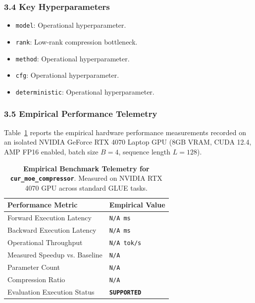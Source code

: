 \subsubsection*{3.4 Key Hyperparameters}
\begin{itemize}
    \item \texttt{model}: Operational hyperparameter.
    \item \texttt{rank}: Low-rank compression bottleneck.
    \item \texttt{method}: Operational hyperparameter.
    \item \texttt{cfg}: Operational hyperparameter.
    \item \texttt{deterministic}: Operational hyperparameter.
\end{itemize}

\subsubsection*{3.5 Empirical Performance Telemetry}
Table~\ref{tab:telemetry_cur_moe_compressor} reports the empirical hardware performance measurements recorded on an isolated NVIDIA GeForce RTX 4070 Laptop GPU (8GB VRAM, CUDA 12.4, AMP FP16 enabled, batch size $B=4$, sequence length $L=128$).

\begin{table}[h]
\centering
\small
\caption{\textbf{Empirical Benchmark Telemetry for \texttt{cur\_moe\_compressor}}. Measured on NVIDIA RTX 4070 GPU across standard GLUE tasks.}
\label{tab:telemetry_cur_moe_compressor}
\begin{tabularx}{\columnwidth}{lX}
\toprule
\textbf{Performance Metric} & \textbf{Empirical Value} \\
\midrule
Forward Execution Latency & \texttt{N/A ms} \\
Backward Execution Latency & \texttt{N/A ms} \\
Operational Throughput & \texttt{N/A tok/s} \\
Measured Speedup vs. Baseline & \texttt{N/A} \\
Parameter Count & \texttt{N/A} \\
Compression Ratio & \texttt{N/A} \\
Evaluation Execution Status & \textbf{\texttt{SUPPORTED}} \\
\bottomrule
\end{tabularx}
\end{table}

